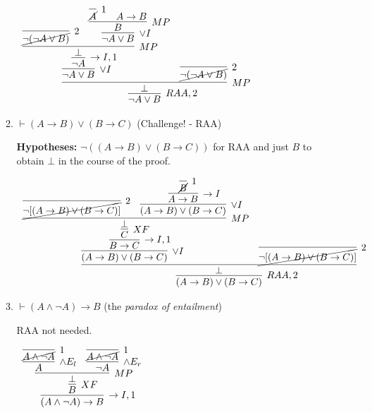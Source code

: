 \documentclass[11pt]{report}
\begin{document}
\begin{enumerate}
\begin{enumerate}
		\begin{mdframed}
			\begin{center}
				$\begin{array}{c}
					\infer[RAA,2]{\lnot A \lor B}
						{\infer[MP]{\bot}
							{\infer[\lor I]{\lnot A \lor B}
								{\infer[\to I,1]{\lnot A}
									{\infer[MP]{\bot}
										{\infer[2]{\cancel{\lnot(\lnot A \lor B)}}{}
										&
										\infer[\lor I]{\lnot A \lor B}
											{\infer[MP]{B}
												{\infer[1]{\cancel{A}}{}
												&
												A \to B}}}}}
							&
							\infer[2]{\cancel{\lnot(\lnot A \lor B)}}{}}}
				\end{array}$
			\end{center}
		\end{mdframed}

		\item $\vdash  ( A \to  B) \lor ( B \to  C)$ \hfill (Challenge! - RAA)

		{\bf Hypotheses:} $\lnot(( A \to  B) \lor ( B \to  C))$ for RAA and just $B$ to obtain $\bot$ in the course of the proof. 	

		\hspace{0.2cm}{\bf Solution}
			\begin{center}
				$\begin{array}{c}
					\infer[RAA,2]{(A \to B) \lor (B \to C)}
						{\infer[]{\bot}
							{\infer[\lor I]{(A \to B) \lor (B \to C)}
								{\infer[\to I,1]{B \to C}
									{\infer[XF]{C}
										{\infer[MP]{\bot}
											{\infer[2]{\cancel{\lnot[(A \to B) \lor (B \to C)]}}{}
											&
											\infer[\lor I]{(A \to B) \lor (B \to C)}
												{\infer[\to I]{A \to B}
													{\infer[1]{\cancel{B}}{}}}}}}}
							&
							\infer[2]{\cancel{\lnot[(A \to B) \lor (B \to C)]}}{}}}				
				\end{array}$
			\end{center}

		\newpage
		\item \(\vdash (A \land \neg A) \to  B\) \hfill (the \emph{paradox of entailment})
		
		\hspace{0.2cm}{\bf Solution}

		RAA not needed. 

		\begin{mdframed}
			\begin{center}
				$\begin{array}{c}
					\infer[\to I,1]{(A \land \lnot A) \to B}
						{\infer[XF]{B}
							{\infer[MP]{\bot}
								{\infer[\land E_{l}]{A}
									{\infer[1]{\cancel{A \land \lnot A}}{}}
								&
								\infer[\land E_{r}]{\lnot A}
									{\infer[1]{\cancel{A \land \lnot A}}{}}}}}
				\end{array}$
			\end{center}
		\end{mdframed}


\end{enumerate}
\end{enumerate}
\end{document}
